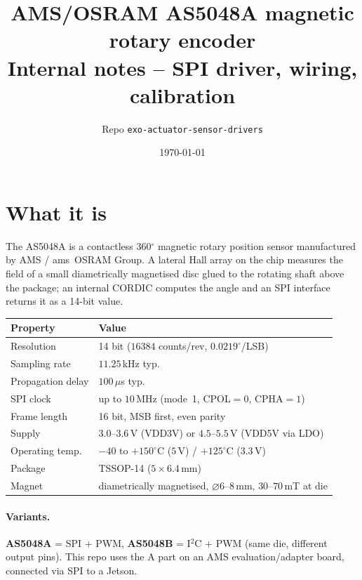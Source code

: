 \documentclass[11pt,a4paper]{article}
\title{\textbf{AMS/OSRAM AS5048A magnetic rotary encoder}\\[2pt]
       \large Internal notes -- SPI driver, wiring, calibration}
\author{Repo \texttt{exo-actuator-sensor-drivers}}
\date{\today}
\begin{document}
\maketitle

\section{What it is}
The AS5048A is a contactless 360$^{\circ}$ magnetic rotary position
sensor manufactured by AMS / ams~OSRAM Group.  A lateral Hall array on
the chip measures the field of a small diametrically magnetised disc
glued to the rotating shaft above the package; an internal CORDIC
computes the angle and an SPI interface returns it as a 14-bit value.

\begin{center}\small
\begin{tabular}{ll}
\toprule
Property & Value\\
\midrule
Resolution         & 14 bit ($16384$ counts/rev, $0.0219^\circ$/LSB)\\
Sampling rate      & $11.25\,$kHz typ.\\
Propagation delay  & $100\,\mu$s typ.\\
SPI clock          & up to $10\,$MHz (mode~1, CPOL$=0$, CPHA$=1$)\\
Frame length       & 16 bit, MSB first, even parity\\
Supply             & $3.0$--$3.6\,$V (VDD3V) or $4.5$--$5.5\,$V (VDD5V via LDO)\\
Operating temp.    & $-40$ to $+150^{\circ}$C ($5\,$V) / $+125^{\circ}$C ($3.3\,$V)\\
Package            & TSSOP-14 ($5 \times 6.4\,$mm)\\
Magnet             & diametrically magnetised, $\diameter 6$--$8\,$mm, $30$--$70\,$mT at die\\
\bottomrule
\end{tabular}
\end{center}

\paragraph{Variants.}
\textbf{AS5048A} = SPI + PWM, \textbf{AS5048B} = I$^2$C + PWM
(same die, different output pins).  This repo uses the A part on an
AMS evaluation/adapter board, connected via SPI to a Jetson.
\end{document}
